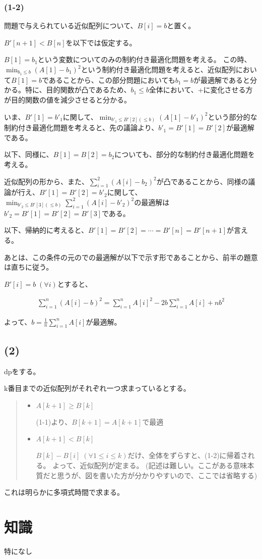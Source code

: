 \documentclass[a4paper, 10pt, dvipdfmx]{jlreq}
\begin{document}
\subsubsection*{(1-2)}

問題で与えられている近似配列について、$B[i]=b$と置く。

$B'[n+1]<B[n]$を以下では仮定する。

$B[1]=b_1$という変数についてのみの制約付き最適化問題を考える。
この時、$\min_{b_1\leq b}(A[1]-b_1)^2$という制約付き最適化問題を考えると、近似配列において$B[1]=b$であることから、この部分問題においても$b_1=b$が最適解であると分かる。特に、目的関数が凸であるため、$b_1 \leq b$全体において、+に変化させる方が目的関数の値を減少させると分かる。

いま、$B'[1]=b'_1$に関して、$\min_{b'_1 \leq B'[2] (\leq b)}(A[1]-b'_1)^2$という部分的な制約付き最適化問題を考えると、先の議論より、$b'_1=B'[1]=B'[2]$が最適解である。

以下、同様に、$B[1]=B[2]=b_2$についても、部分的な制約付き最適化問題を考える。

近似配列の形から、また、$\sum_{i=1}^{2}(A[i]-b_2)^2$が凸であることから、同様の議論が行え、$B'[1]=B'[2]=b'_2$に関して、$\min_{b'_2\leq B'[3](\leq b)}\sum_{i=1}^{2}(A[i]-b'_2)^2$の最適解は$b'_2=B'[1]=B'[2]=B'[3]$である。

以下、帰納的に考えると、$B'[1]=B'[2]=\cdots=B'[n]=B'[n+1]$が言える。

あとは、この条件の元のでの最適解が以下で示す形であることから、前半の題意は直ちに従う。

$B'[i]=b \; (\forall i)$とすると、

\begin{align*}
    \sum_{i=1}^{n}{(A[i]-b)^2} = \sum_{i=1}^{n}{A[i]^2} -2b \sum_{i=1}^{n}{A[i]} + nb^2
\end{align*}

よって、$b=\frac{1}{n}\sum_{i=1}^{n}{A[i]}$が最適解。

\subsection*{(2)}

dpをする。

k番目までの近似配列がそれぞれ一つ求まっているとする。

\begin{quote}
    \begin{itemize}
        \item  $A[k+1] \geq B[k]$

              (1-1)より、$B[k+1]=A[k+1]$で最適

        \item  $A[k+1] < B[k]$

              $B[k]-B[i] \; (\forall 1 \leq i \leq k)$だけ、全体をずらすと、(1-2)に帰着される。
              よって、近似配列が定まる。
              (記述は難しい。ここがある意味本質だと思うが、図を書いた方が分かりやすいので、ここでは省略する)
    \end{itemize}
\end{quote}

これは明らかに多項式時間で求まる。

\section{知識}

特になし
\end{document}
